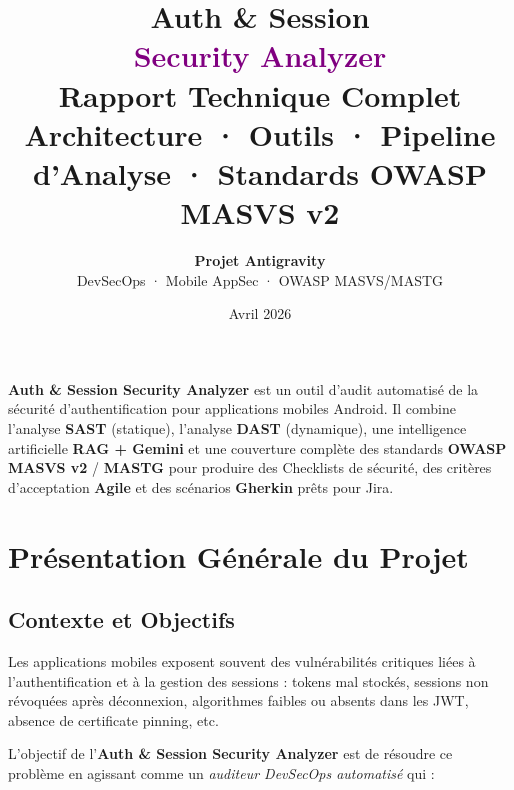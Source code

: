 \documentclass[12pt,a4paper,french]{article}
\title{%
  \vspace{-1cm}
  {\Huge\textbf{\textcolor{primary}{Auth \& Session}}}\\[4pt]
  {\Huge\textbf{\textcolor{purple}{Security Analyzer}}}\\[8pt]
  {\large\textcolor{mutedtxt}{Rapport Technique Complet}}\\[4pt]
  {\normalsize\textcolor{mutedtxt}{Architecture · Outils · Pipeline d'Analyse · Standards OWASP MASVS v2}}
}
\author{%
  \textbf{Projet Antigravity}\\
  \small\textcolor{mutedtxt}{DevSecOps · Mobile AppSec · OWASP MASVS/MASTG}
}
\date{\textcolor{mutedtxt}{Avril 2026}}
\begin{document}

\maketitle
\thispagestyle{empty}

\vspace{0.5cm}

\begin{tcolorbox}[
  enhanced,
  colback=darkbg,
  colframe=primary,
  fontupper=\color{white}\normalsize,
  arc=8pt, boxrule=1pt,
  left=12pt, right=12pt, top=10pt, bottom=10pt
]
\textbf{Auth \& Session Security Analyzer} est un outil d'audit automatisé de la sécurité
d'authentification pour applications mobiles Android.
Il combine l'analyse \textbf{SAST} (statique), l'analyse \textbf{DAST} (dynamique),
une intelligence artificielle \textbf{RAG + Gemini} et une couverture complète des standards
\textbf{OWASP MASVS v2} / \textbf{MASTG} pour produire des Checklists de sécurité,
des critères d'acceptation \textbf{Agile} et des scénarios \textbf{Gherkin} prêts pour Jira.
\end{tcolorbox}

\vspace{0.4cm}
\tableofcontents
\newpage

\section{Présentation Générale du Projet}

\subsection{Contexte et Objectifs}

Les applications mobiles exposent souvent des vulnérabilités critiques liées à
l'authentification et à la gestion des sessions : tokens mal stockés, sessions
non révoquées après déconnexion, algorithmes faibles ou absents dans les JWT,
absence de certificate pinning, etc.

L'objectif de l'\textbf{Auth \& Session Security Analyzer} est de résoudre ce problème
en agissant comme un \textit{auditeur DevSecOps automatisé} qui :
\end{document}
